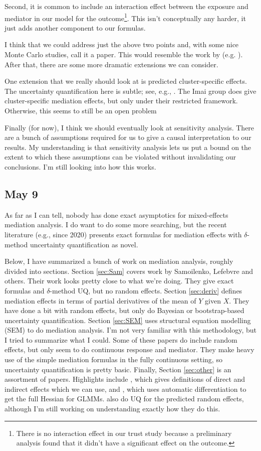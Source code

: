 \documentclass{article}
\begin{document}
Second, it is common to include an interaction effect between the exposure and mediator in our model for the outcome\footnote{There is no interaction effect in our trust study because a preliminary analysis found that it didn't have a significant effect on the outcome.}. This isn't conceptually any harder, it just adds another component to our formulas. 

I think that we could address just the above two points and, with some nice Monte Carlo studies, call it a paper. This would resemble the work by \citeauthor{Sam23} (e.g. \citealp{Sam23}). After that, there are some more dramatic extensions we can consider.

One extension that we really should look at is predicted cluster-specific effects. The uncertainty quantification here is subtle; see, e.g., \citet{Skr09,Boo98}. The Imai group does give cluster-specific mediation effects, but only under their restricted framework. Otherwise, this seems to still be an open problem

Finally (for now), I think we should eventually look at sensitivity analysis. There are a bunch of assumptions required for us to give a causal interpretation to our results. My understanding is that sensitivity analysis lets us put a bound on the extent to which these assumptions can be violated without invalidating our conclusions. I'm still looking into how this works.


\subsection{May 9}

As far as I can tell, nobody has done exact asymptotics for mixed-effects mediation analysis. I do want to do some more searching, but the recent literature (e.g., since 2020) presents exact formulas for mediation effects with $\delta$-method uncertainty quantification as novel. 

Below, I have summarized a bunch of work on mediation analysis, roughly divided into sections. Section \ref{sec:Sam} covers work by Samoilenko, Lefebvre and others. Their work looks pretty close to what we're doing. They give exact formulas and $\delta$-method UQ, but no random effects. Section \ref{sec:deriv} defines mediation effects in terms of partial derivatives of the mean of $Y$ given $X$. They have done a bit with random effects, but only do Bayesian or bootstrap-based uncertainty quantification. Section \ref{sec:SEM} uses structural equation modelling (SEM) to do mediation analysis. I'm not very familiar with this methodology, but I tried to summarize what I could. Some of these papers do include random effects, but only seem to do continuous response and mediator. They make heavy use of the simple mediation formulas in the fully continuous setting, so uncertainty quantification is pretty basic. Finally, Section \ref{sec:other} is an assortment of papers. Highlights include \citet{Che21}, which gives definitions of direct and indirect effects which we can use, and \citet{Zhe21}, which uses automatic differentiation to get the full Hessian for GLMMs. \citeauthor{Zhe21} also do UQ for the predicted random effects, although I'm still working on understanding exactly how they do this.
\end{document}
